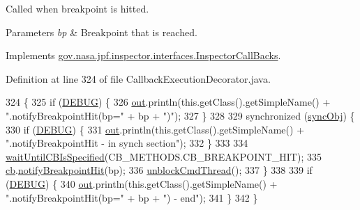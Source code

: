 Called when breakpoint is hitted. 


\begin{DoxyParams}{Parameters}
{\em bp} & Breakpoint that is reached. \\
\hline
\end{DoxyParams}


Implements \hyperlink{interfacegov_1_1nasa_1_1jpf_1_1inspector_1_1interfaces_1_1_inspector_call_backs_a130333a1ece0818a1161ca8597d027e6}{gov.\+nasa.\+jpf.\+inspector.\+interfaces.\+Inspector\+Call\+Backs}.



Definition at line 324 of file Callback\+Execution\+Decorator.\+java.


\begin{DoxyCode}
324                                                         \{
325     \textcolor{keywordflow}{if} (\hyperlink{classgov_1_1nasa_1_1jpf_1_1inspector_1_1client_1_1_callback_execution_decorator_a28cdde5503944b9bff2957ae0dc55d16}{DEBUG}) \{
326       \hyperlink{classgov_1_1nasa_1_1jpf_1_1inspector_1_1client_1_1_callback_execution_decorator_a30138942cde8b1d228acac772187354c}{out}.println(this.getClass().getSimpleName() + \textcolor{stringliteral}{".notifyBreakpointHit(bp="} + bp + \textcolor{stringliteral}{")"});
327     \}
328 
329     \textcolor{keyword}{synchronized} (\hyperlink{classgov_1_1nasa_1_1jpf_1_1inspector_1_1client_1_1_callback_execution_decorator_a44534c6f15095fc46c7e6cddc7e379da}{syncObj}) \{
330       \textcolor{keywordflow}{if} (\hyperlink{classgov_1_1nasa_1_1jpf_1_1inspector_1_1client_1_1_callback_execution_decorator_a28cdde5503944b9bff2957ae0dc55d16}{DEBUG}) \{
331         \hyperlink{classgov_1_1nasa_1_1jpf_1_1inspector_1_1client_1_1_callback_execution_decorator_a30138942cde8b1d228acac772187354c}{out}.println(this.getClass().getSimpleName() + \textcolor{stringliteral}{".notifyBreakpointHit - in synch section"});
332       \}
333 
334       \hyperlink{classgov_1_1nasa_1_1jpf_1_1inspector_1_1client_1_1_callback_execution_decorator_abc8ba1848d45494678b0a9f2c130dd23}{waitUntilCBIsSpecified}(CB\_METHODS.CB\_BREAKPOINT\_HIT);
335       \hyperlink{classgov_1_1nasa_1_1jpf_1_1inspector_1_1client_1_1_callback_execution_decorator_a3368e5a926aa09b3c9bd244ee790f3f3}{cb}.\hyperlink{interfacegov_1_1nasa_1_1jpf_1_1inspector_1_1interfaces_1_1_inspector_call_backs_a130333a1ece0818a1161ca8597d027e6}{notifyBreakpointHit}(bp);
336       \hyperlink{classgov_1_1nasa_1_1jpf_1_1inspector_1_1client_1_1_callback_execution_decorator_a27970d201d0e36472350baacdb705105}{unblockCmdThread}();
337     \}
338 
339     \textcolor{keywordflow}{if} (\hyperlink{classgov_1_1nasa_1_1jpf_1_1inspector_1_1client_1_1_callback_execution_decorator_a28cdde5503944b9bff2957ae0dc55d16}{DEBUG}) \{
340       \hyperlink{classgov_1_1nasa_1_1jpf_1_1inspector_1_1client_1_1_callback_execution_decorator_a30138942cde8b1d228acac772187354c}{out}.println(this.getClass().getSimpleName() + \textcolor{stringliteral}{".notifyBreakpointHit(bp="} + bp + \textcolor{stringliteral}{") - end"});
341     \}
342   \}
\end{DoxyCode}
